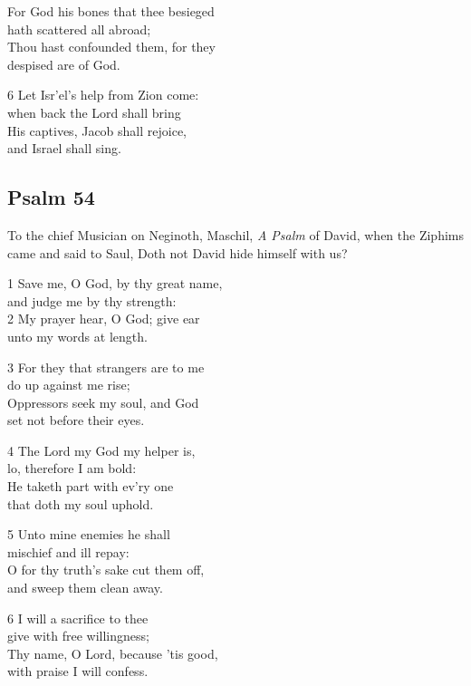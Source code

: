 \begin{multicols}{3}
For God his bones that thee besieged\\
hath scattered all abroad;\\
Thou hast confounded them, for they\\
despised are of God.

6 Let Isr’el’s help from Zion come:\\
when back the Lord shall bring\\
His captives, Jacob shall rejoice,\\
and Israel shall sing.


\begin{center}
\quad{}\quad{}
\end{center}

\subsection*{Psalm 54}

To the chief Musician on Neginoth, Maschil, \emph{A Psalm} of David, when the Ziphims came and said to Saul, Doth not David hide himself with us?

1 Save me, O God, by thy great name,\\
and judge me by thy strength:\\
2 My prayer hear, O God; give ear\\
unto my words at length.

3 For they that strangers are to me\\
do up against me rise;\\
Oppressors seek my soul, and God\\
set not before their eyes.

4 The Lord my God my helper is,\\
lo, therefore I am bold:\\
He taketh part with ev’ry one\\
that doth my soul uphold.

5 Unto mine enemies he shall\\
mischief and ill repay:\\
O for thy truth’s sake cut them off,\\
and sweep them clean away.

6 I will a sacrifice to thee\\
give with free willingness;\\
Thy name, O Lord, because ’tis good,\\
with praise I will confess.


\end{multicols}
